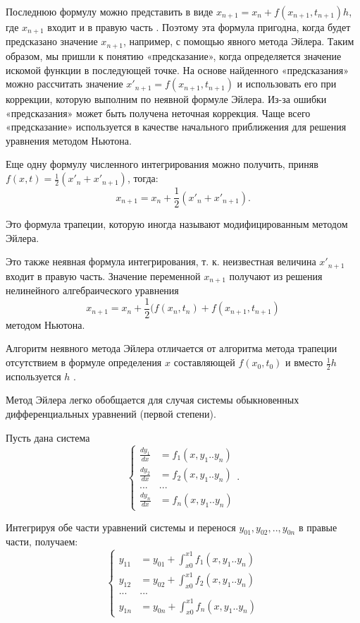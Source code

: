 Последнюю формулу можно представить  в виде $x_{n+1} =x_n +f(x_{n+1},t_{n+1} )h$, где  $x_{n+1}$ входит и в правую 
часть .  Поэтому  эта  формула  пригодна,  когда  будет  предсказано  значение  $x_{n+1}$, 
например,  с  помощью  явного  метода  Эйлера.  Таким  образом,  мы  пришли  к  понятию 
«предсказание»,  когда  определяется  значение  искомой  функции  в  последующей  точке.  На 
основе  найденного  «предсказания»  можно  рассчитать  значение  $x'_{n+1}=  f ( x_{n+1},t_{n+1} )$ и 
использовать  его  при  коррекции,  которую  выполним  по  неявной  формуле  Эйлера.  Из-за 
ошибки «предсказания» может быть получена неточная коррекция. Чаще всего «предсказание» 
используется  в  качестве  начального  приближения  для  решения  уравнения  методом 
Ньютона. 
         
Еще  одну  формулу  численного  интегрирования  можно  получить,  приняв \\
$f(x,t)=\frac{1}{2}(x'_n+x'_{n+1})$, тогда:                                                                                        
$$x_{n+1}=x_n+\frac{1}{2}(x'_n+x'_{n+1}).$$

Это формула трапеции, которую иногда называют модифицированным методом Эйлера. 

Это  также  неявная  формула  интегрирования,  т.  к.  неизвестная  величина  $x'_{n+1}$  входит  в 
правую часть. Значение переменной  $x_{n+1}$ получают из решения нелинейного алгебраического 
уравнения  
$$x_{n+1}=x_n+\frac{1}{2}(f(x_n,t_n)+f(x_{n+1},t_{n+1})$$
методом Ньютона. 

Алгоритм неявного метода Эйлера отличается от алгоритма метода трапеции отсутствием в 
формуле определения  $x$  составляющей  $f (x_0,t_0)$  и вместо 
$\frac{1}{2}h$  используется $h$ . 

Метод Эйлера легко обобщается для случая системы обыкновенных дифференциальных уравнений (первой степени).

Пусть дана система 
$$\left\{\begin{array}{cc}
\frac{dy_1}{dx} & =f_1(x,y_1..y_n)\\
\frac{dy_2}{dx} & =f_2(x,y_1..y_n)\\
...&...\\
\frac{dy_n}{dx} & =f_n(x,y_1..y_n)
\end{array}\right.
.$$

Интегрируя обе части уравнений системы и перенося $y_{01},y_{02},..,y_{0n}$ в правые части, получаем:
$$\left\{\begin{array}{cc}
y_{11} & = y_{01}+\int_{x0}^{x1} f_1(x,y_1..y_n)\\
y_{12} & = y_{02}+\int_{x0}^{x1} f_2(x,y_1..y_n)\\
...&...\\
y_{1n} & = y_{0n}+\int_{x0}^{x1} f_n(x,y_1..y_n)
\end{array}\right.
$$

